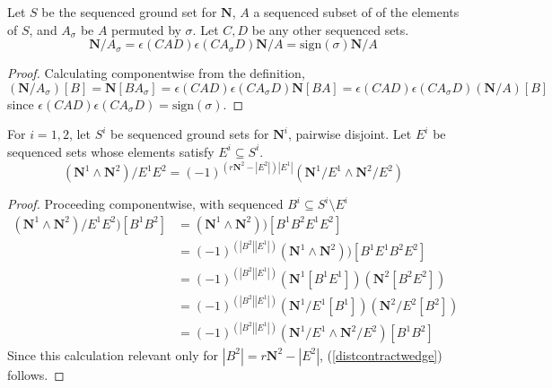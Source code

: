 \documentclass[Unicode]{cedram-alco}
\newcommand{\ext}[1]{\ensuremath{\mathbf{#1}}}
\begin{document}
    \begin{prop}
      Let $S$ be the sequenced ground set for $\ext{N}$, $A$ a sequenced subset of
      of the elements of $S$, and $A_\sigma$ be $A$ permuted by $\sigma$.  Let $C, D$ be any other sequenced
      sets.
      \begin{equation}\label{permuteContraction}
        \ext{N}/A_\sigma = \epsilon(CAD)\epsilon(CA_\sigma D)\ext{N}/A = \text{sign}(\sigma)\ext{N}/A
      \end{equation}
    \end{prop}
    \begin{proof}
      Calculating componentwise from the definition,
      \[
      (\ext{N}/A_\sigma)[B]=\ext{N}[BA_\sigma]=\epsilon(CAD)\epsilon(CA_\sigma D)\ext{N}[BA]=
      \epsilon(CAD)\epsilon(CA_\sigma D)(\ext{N}/A)[B]
      \]
      since $\epsilon(CAD)\epsilon(CA_\sigma D)=\text{sign}(\sigma)$.
    \end{proof}


    \begin{prop}
      For $i=1, 2$, let $S^{i}$ be sequenced ground sets for $\ext{N}^{i}$, pairwise disjoint.
      Let $E^i$ be sequenced sets whose elements satisfy $E^i\subseteq S^i$.
      \begin{equation}\label{distcontractwedge}
        (\ext{N}^1 \wedge \ext{N}^2)/E^1E^2 = (-1)^{(r\ext{N}^2-|E^2|) |E^1|} (\ext{N}^1/E^1 \wedge \ext{N}^2/E^2)
      \end{equation}
    \end{prop}
    \begin{proof}
      Proceeding componentwise, with sequenced $B^i\subseteq S^i\setminus E^i$
      \begin{equation*}
        \begin{split}
      (\ext{N}^1 \wedge \ext{N}^2)/E^1E^2)[B^1B^2]
      &=(\ext{N}^1 \wedge \ext{N}^2))[B^1B^2E^1E^2]
      \\
      &=(-1)^{(|B^2| |E^1|)} (\ext{N}^1 \wedge \ext{N}^2))[B^1E^1B^2E^2]
      \\
      &=(-1)^{(|B^2| |E^1|)} (\ext{N}^1[B^1E^1])( \ext{N}^2[B^2E^2])
      \\
      &=(-1)^{(|B^2| |E^1|)} (\ext{N}^1/E^1[B^1])( \ext{N}^2/E^2[B^2])
      \\
      &=(-1)^{(|B^2| |E^1|)} (\ext{N}^1/E^1 \wedge \ext{N}^2/E^2)[B^1B^2]
        \end{split}
      \end{equation*}
      Since this calculation relevant only for $|B^2|=r\ext{N}^2-|E^2|$, (\ref{distcontractwedge}) follows.
    \end{proof}
\end{document}
